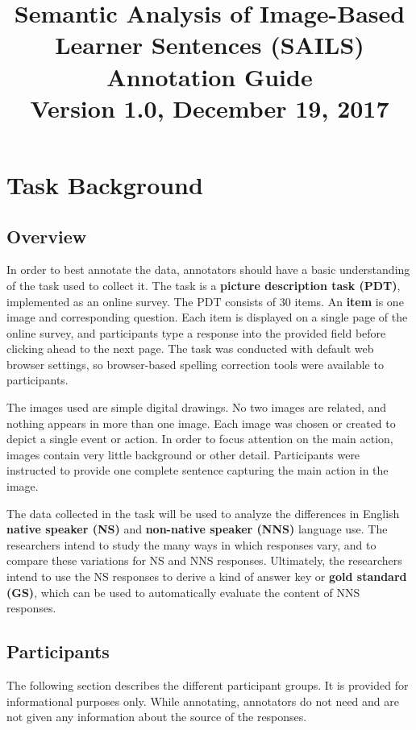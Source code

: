 \documentclass[12pt]{article}
\title{\large{Semantic Analysis of Image-Based Learner Sentences (SAILS)} \\ Annotation Guide \\ Version 1.0, December 19, 2017}
\date{}
\begin{document}
\maketitle
\tableofcontents
\clearpage

\section{Task Background} \label{sec:background}

\subsection{Overview}
In order to best annotate the data, annotators should have a basic understanding of the task used to collect it. The task is a \textbf{picture description task (PDT)}, implemented as an online survey. The PDT consists of 30 items. An \textbf{item} is one image and corresponding question. Each item is displayed on a single page of the online survey, and participants type a response into the provided field before clicking ahead to the next page. The task was conducted with default web browser settings, so browser-based spelling correction tools were available to participants.

The images used are simple digital drawings. No two images are related, and nothing appears in more than one image. Each image was chosen or created to depict a single event or action. In order to focus attention on the main action, images contain very little background or other detail. Participants were instructed to provide one complete sentence capturing the main action in the image. 

The data collected in the task will be used to analyze the differences in English \textbf{native speaker (NS)} and \textbf{non-native speaker (NNS)} language use. The researchers intend to study the many ways in which responses vary, and to compare these variations for NS and NNS responses. Ultimately, the researchers intend to use the NS responses to derive a kind of answer key or \textbf{gold standard (GS)}, which can be used to automatically evaluate the content of NNS responses.

\subsection{Participants}
The following section describes the different participant groups. It is provided for informational purposes only. While annotating, annotators do not need and are not given any information about the source of the responses.
\end{document}
